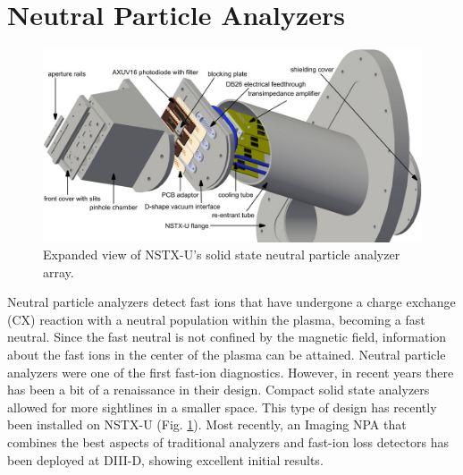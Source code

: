 \section{Neutral Particle Analyzers}
\begin{figure}[ht]
    \centering
    \includegraphics[width=12cm]{figures/nstx_npa.jpeg}
    \caption{Expanded view of NSTX-U's solid state neutral particle analyzer array.\cite{liu2014design}}
    \label{fig:npa}
\end{figure}
Neutral particle analyzers detect fast ions that have undergone a charge exchange (CX) reaction with a neutral population within the plasma, becoming a fast neutral. Since the fast neutral is not confined by the magnetic field, information about the fast ions in the center of the plasma can be attained. Neutral particle analyzers were one of the first fast-ion diagnostics\cite{artsimovich1969experiments}. However, in recent years there has been a bit of a renaissance in their design. Compact solid state analyzers\cite{zhu2012compact} allowed for more sightlines in a smaller space. This type of design has recently been installed on NSTX-U (Fig. \ref{fig:npa}). Most recently, an Imaging NPA that combines the best aspects of traditional analyzers and fast-ion loss detectors has been deployed at DIII-D, showing excellent initial results\cite{du2018inpa}.

